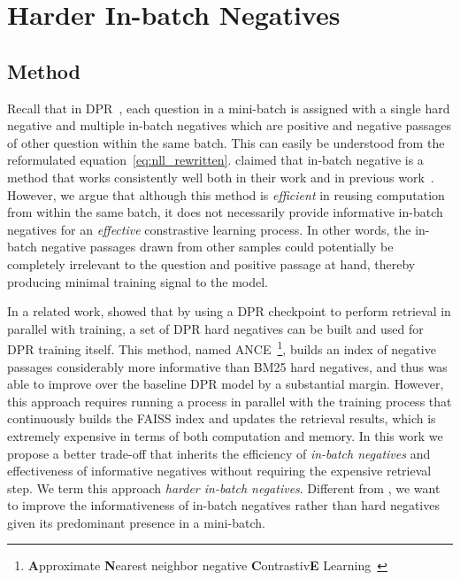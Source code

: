 
\chapter{Harder In-batch Negatives} %
\label{ch:harder_inbatch_negatives}


\section{Method}
\label{sec:harder_inbatch_negatives_method}


%
Recall that in DPR~\cite{karpukhin2020dense}, each question in a mini-batch is assigned with a single hard negative and multiple in-batch negatives which are positive and negative passages of other question within the same batch.
%
This can easily be understood from the reformulated equation~\eqref{eq:nll_rewritten}.
%
\citet{karpukhin2020dense} claimed that in-batch negative is a method that works consistently well both in their work and in previous work~\cite{yih2011learning, henderson2017efficient, gillick2019learning}.
%
However, we argue that although this method is \emph{efficient} in reusing computation from within the same batch, it does not necessarily provide informative in-batch negatives for an \emph{effective} constrastive learning process.
%
In other words, the in-batch negative passages drawn from other samples could potentially be completely irrelevant to the question and positive passage at hand, thereby producing minimal training signal to the model.

%
In a related work, \citet{xiong2020approximate} showed that by using a DPR checkpoint to perform retrieval in parallel with training, a set of DPR hard negatives can be built and used for DPR training itself.
%
This method, named ANCE~\footnote{\textbf{A}pproximate \textbf{N}earest neighbor negative \textbf{C}ontrastiv\textbf{E} Learning~\cite{xiong2020approximate}}, builds an index of negative passages considerably more informative than BM25 hard negatives, and thus was able to improve over the baseline DPR model by a substantial margin.
%
However, this approach requires running a process in parallel with the training process that continuously builds the FAISS index and updates the retrieval results, which is extremely expensive in terms of both computation and memory.
%
In this work we propose a better trade-off that inherits the efficiency of \emph{in-batch negatives} and effectiveness of informative negatives without requiring the expensive retrieval step.
%
We term this approach \emph{harder in-batch negatives}.
%
Different from \citet{xiong2020approximate}, we want to improve the informativeness of in-batch negatives rather than hard negatives given its predominant presence in a mini-batch.
%

